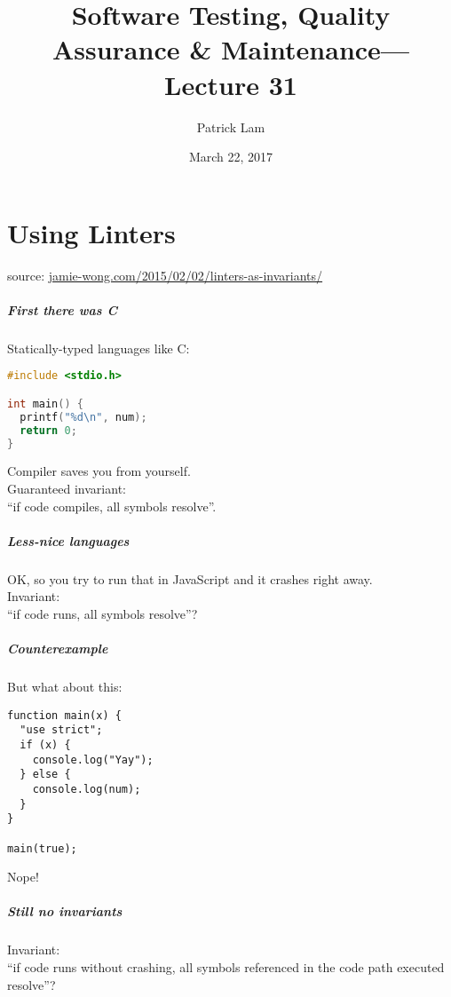 \documentclass{beamer}
\title{Software Testing, Quality Assurance \& Maintenance---Lecture 31}
\author{Patrick Lam}
\date{March 22, 2017}
\newenvironment{changemargin}[1]{%
  \begin{list}{}{%
    \setlength{\topsep}{0pt}%
    \setlength{\leftmargin}{#1}%
    \setlength{\rightmargin}{1em}
    \setlength{\listparindent}{\parindent}%
    \setlength{\itemindent}{\parindent}%
    \setlength{\parsep}{\parskip}%
  }%
  \item[]}{\end{list}}
\begin{document}
\begin{frame}
  \titlepage
\end{frame}

\part{Using Linters}

\begin{frame}
\partpage
\small
source: \url{jamie-wong.com/2015/02/02/linters-as-invariants/}
\end{frame}

\begin{frame}[fragile]
\frametitle{First there was C}
\begin{changemargin}{2cm}
Statically-typed languages like C:
\begin{lstlisting}[language=C]
#include <stdio.h>

int main() {
  printf("%d\n", num);
  return 0;
}
\end{lstlisting}
Compiler saves you from yourself.\\[1em]
Guaranteed invariant:\\
\hspace*{2em} ``if code compiles, all symbols resolve''.
\end{changemargin}
\end{frame}

\begin{frame}[fragile]
\frametitle{Less-nice languages}
\begin{changemargin}{2cm}
OK, so you try to run that in JavaScript and it crashes right away.\\[1em]

Invariant:\\
\hspace*{2em} ``if code runs, all symbols resolve''?
\end{changemargin}
\end{frame}

\begin{frame}[fragile]
\frametitle{Counterexample}
\begin{changemargin}{2cm}
But what about this:
\begin{lstlisting}
function main(x) {
  "use strict";
  if (x) {
    console.log("Yay");
  } else {
    console.log(num);
  }
}

main(true);
\end{lstlisting}
Nope!
\end{changemargin}
\end{frame}
\begin{frame}[fragile]
\frametitle{Still no invariants}
\begin{changemargin}{2cm}
Invariant:\\
\hspace*{2em} ``if code runs without crashing, all symbols referenced in the code path executed resolve''?
\end{changemargin}
\end{frame}
\end{document}
